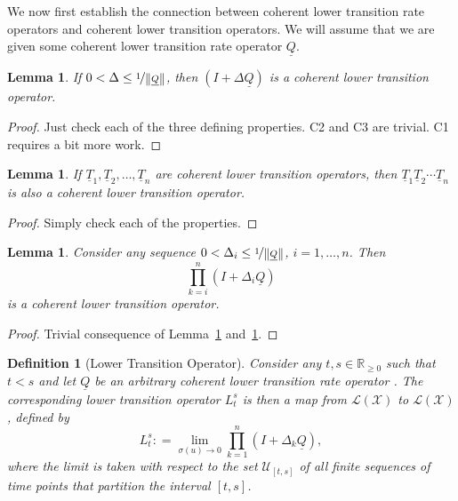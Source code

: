 \documentclass[10pt]{paper}
\newtheorem{lemma}[theorem]{Lemma}
\newtheorem{definition}{Definition}
\newcommand{\reals}{\mathbb{R}}
\newcommand{\realsnonneg}{\reals_{\geq 0}}
\newcommand{\states}{\mathcal{X}}
\newcommand{\lt}{\underline{T}}
\newcommand{\lbound}{L}
\newcommand{\gambles}{\mathcal{L}}
\newcommand{\gamblesX}{\gambles(\states)}
\newcommand{\lrate}{\underline{Q}}
\newcommand{\norm}[1]{\left\lVert #1 \right\rVert}
\newcommand{\coloneqq}{:\!=}
\begin{document}
We now first establish the connection between coherent lower transition rate operators and coherent lower transition operators. We will assume that we are given some coherent lower transition rate operator $\lrate$.

\begin{lemma}\label{lemma:normQsmallenough}
If $0<\Delta\leq\nicefrac{1}{\norm{\lrate}}$, then $(I+\Delta\lrate)$ is a coherent lower transition operator.
\end{lemma}
\begin{proof}
Just check each of the three defining properties. C2 and C3 are trivial. C1 requires a bit more work.
\end{proof}

\begin{lemma}\label{lemma:compositioncoherence}
If $\lt_1,\lt_2,\dots,\lt_n$ are coherent lower transition operators, then  $\lt_1\lt_2\cdots\lt_n$ is also a coherent lower transition operator.
\end{lemma}
\begin{proof}
Simply check each of the properties.
\end{proof}

\begin{lemma}\label{lemma:productiscoherent}
Consider any sequence $0<\Delta_i\leq\nicefrac{1}{\norm{\lrate}}$, $i=1,\dots,n$. Then
\begin{equation*}
\prod_{k=i}^n(I+\Delta_i\lrate)
\end{equation*}
is a coherent lower transition operator.
\end{lemma}
\begin{proof}
Trivial consequence of Lemma~\ref{lemma:normQsmallenough} and~\ref{lemma:compositioncoherence}.
\end{proof}

\begin{definition}[Lower Transition Operator]\label{def:low_trans}
Consider any $t,s\in\realsnonneg$ such that $t<s$ and let $\lrate$ be an arbitrary coherent lower transition rate operator . The corresponding \emph{lower transition operator} $\lbound_t^s$ is then a map from $\gamblesX$ to $\gamblesX$, defined by
\begin{equation}\label{eq:lowerbound}
\lbound_t^s\coloneqq\lim_{\sigma(u)\to0}\prod_{k=1}^n(I+\Delta_k\lrate),
\end{equation}
where the limit is taken with respect to the set $\mathcal{U}_{[t,s]}$ of all finite sequences of time points that partition the interval $[t,s]$.
\end{definition}
\end{document}
